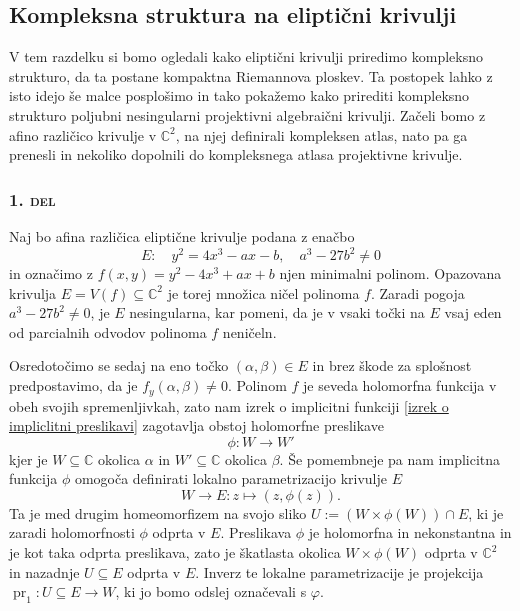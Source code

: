 \documentclass[mat1]{fmfdelo}
\newcommand{\C}{\mathbb C}
\DeclareMathOperator{\pr}{pr}
\theoremstyle{definition}
\begin{document}

\subsection{Kompleksna struktura na eliptični krivulji}

V tem razdelku si bomo ogledali kako eliptični krivulji 
priredimo kompleksno strukturo, da ta postane kompaktna Riemannova ploskev. Ta postopek lahko z isto idejo še malce posplošimo in tako pokažemo kako prirediti kompleksno strukturo poljubni nesingularni projektivni algebraični krivulji. Začeli bomo z afino različico krivulje v $\C^2$, na njej definirali kompleksen atlas, nato pa ga prenesli in nekoliko dopolnili do kompleksnega atlasa projektivne krivulje. 

\subsubsection*{\textsc{1. del}}
Naj bo afina različica eliptične krivulje podana z enačbo
\[
    E: \quad y^2 = 4x^3 - ax - b, \quad a^3 - 27b^2 \neq 0
\]
in označimo z $f(x,y) = y^2 - 4x^3 + ax + b$ njen minimalni polinom. Opazovana krivulja $E = V(f) \subseteq \C^2$ je torej množica ničel polinoma $f$. Zaradi pogoja $a^3 - 27b^2 \neq 0$, je $E$ nesingularna, kar pomeni, da je v vsaki točki na $E$ vsaj eden od parcialnih odvodov polinoma $f$ neničeln. 

Osredotočimo se sedaj na eno točko $(\alpha, \beta) \in E$ in brez škode za splošnost predpostavimo, da je $f_y(\alpha, \beta) \neq 0$. Polinom $f$ je seveda holomorfna funkcija v obeh svojih spremenljivkah, zato nam izrek o implicitni funkciji \ref{izrek o impliclitni preslikavi} zagotavlja obstoj holomorfne preslikave 
\[
    \phi : W \to W'  
\]
kjer je $W \subseteq \C$ okolica $\alpha$ in $W' \subseteq \C$ okolica $\beta$. Še pomembneje pa nam implicitna funkcija $\phi$ omogoča definirati lokalno parametrizacijo krivulje $E$
\[
    W \to E : z \mapsto (z, \phi(z)).
\] 
Ta je med drugim homeomorfizem na svojo sliko $U := (W \times \phi(W)) \cap E$, ki je zaradi holomorfnosti $\phi$ odprta v $E$. Preslikava $\phi$ je holomorfna in nekonstantna in je kot taka odprta preslikava, zato je škatlasta okolica $W \times \phi(W)$ odprta v $\C^2$ in nazadnje $U \subseteq E$ odprta v $E$. Inverz te lokalne parametrizacije je projekcija $\pr_1 : U \subseteq E \to W$, ki jo bomo odslej označevali s $\varphi$. 
\end{document}
